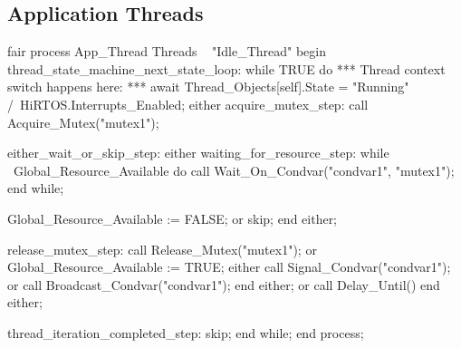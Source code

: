 \documentclass[sigplan,anonymous,10pt]{acmart}
\begin{document}
\subsection{Application Threads}

\begin{ppcal}
fair process App_Thread \in Threads \ { "Idle_Thread" }
begin
   thread_state_machine_next_state_loop:
   while TRUE do
      \* *** Thread context switch happens here: ***
      await Thread_Objects[self].State = "Running" /\ 
            HiRTOS.Interrupts_Enabled;
      either
         acquire_mutex_step:
         call Acquire_Mutex("mutex1");

         either_wait_or_skip_step:
         either
             waiting_for_resource_step:
             while ~Global_Resource_Available do
                 call Wait_On_Condvar("condvar1",
                                      "mutex1");
             end while;

             Global_Resource_Available := FALSE;
         or
           skip;
         end either;

         release_mutex_step:
         call Release_Mutex("mutex1");
      or
         Global_Resource_Available := TRUE;
         either
            call Signal_Condvar("condvar1");
         or
            call Broadcast_Condvar("condvar1");
         end either;
      or
         call Delay_Until()
       end either;

      thread_iteration_completed_step:
      skip;
   end while;
end process;
\end{ppcal}
\end{document}
